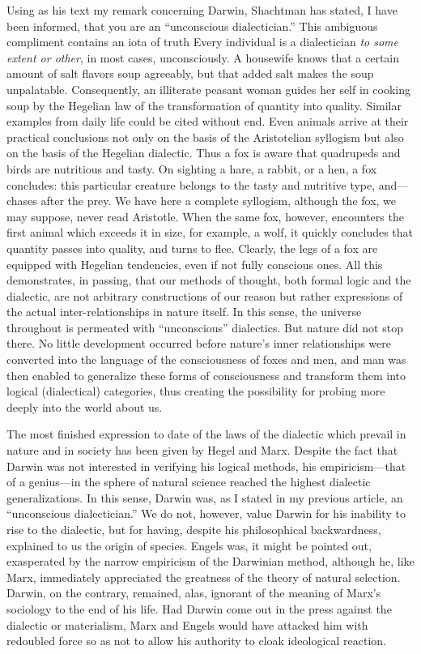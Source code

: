 Using as his text my remark concerning Darwin, Shachtman has stated, I have been informed, that you are an “unconscious dialectician.” This ambiguous compliment contains an iota of truth Every individual is a dialectician \emph{to some extent or other}, in most cases, unconsciously. A housewife knows that a certain amount of salt flavors soup agreeably, but that added salt makes the soup unpalatable. Consequently, an illiterate peasant woman guides her self in cooking soup by the Hegelian law of the transformation of quantity into quality. Similar examples from daily life could be cited without end. Even animals arrive at their practical conclusions not only on the basis of the Aristotelian syllogism but also on the basis of the Hegelian dialectic. Thus a fox is aware that quadrupeds and birds are nutritious and tasty. On sighting a hare, a rabbit, or a hen, a fox concludes: this particular creature belongs to the tasty and nutritive type, and---chases after the prey. We have here a complete syllogism, although the fox, we may suppose, never read Aristotle. When the same fox, however, encounters the first animal which exceeds it in size, for example, a wolf, it quickly concludes that quantity passes into quality, and turns to flee. Clearly, the legs of a fox are equipped with Hegelian tendencies, even if not fully conscious ones. All this demonstrates, in passing, that our methods of thought, both formal logic and the dialectic, are not arbitrary constructions of our reason but rather expressions of the actual inter-relationships in nature itself. In this sense, the universe throughout is permeated with “unconscious” dialectics. But nature did not stop there. No little development occurred before nature’s inner relationships were converted into the language of the consciousness of foxes and men, and man was then enabled to generalize these forms of consciousness and transform them into logical (dialectical) categories, thus creating the possibility for probing more deeply into the world about us.

The most finished expression to date of the laws of the dialectic which prevail in nature and in society has been given by Hegel and Marx. Despite the fact that Darwin was not interested in verifying his logical methods, his empiricism---that of a genius---in the sphere of natural science reached the highest dialectic generalizations. In this sense, Darwin was, as I stated in my previous article, an “unconscious dialectician.” We do not, however, value Darwin for his inability to rise to the dialectic, but for having, despite his philosophical backwardness, explained to us the origin of species. Engels was, it might be pointed out, exasperated by the narrow empiricism of the Darwinian method, although he, like Marx, immediately appreciated the greatness of the theory of natural selection. Darwin, on the contrary, remained, alas, ignorant of the meaning of Marx’s sociology to the end of his life. Had Darwin come out in the press against the dialectic or materialism, Marx and Engels would have attacked him with redoubled force so as not to allow his authority to cloak ideological reaction.

